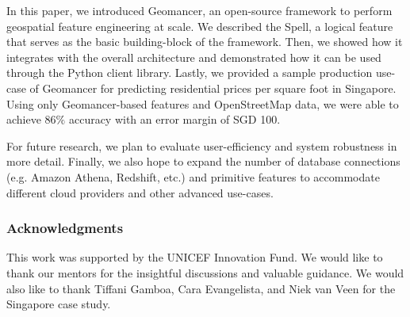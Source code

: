 \documentclass{article}
\begin{document}
In this paper, we introduced Geomancer, an open-source framework to perform
geospatial feature engineering at scale. We described the Spell, a logical
feature that serves as the basic building-block of the framework. Then, we
showed how it integrates with the overall architecture and demonstrated how it
can be used through the Python client library. Lastly, we provided a sample
production use-case of Geomancer for predicting residential prices per square
foot in Singapore. Using only Geomancer-based features and OpenStreetMap data,
we were able to achieve $86\%$ accuracy with an error margin of SGD 100. 

For future research, we plan to evaluate user-efficiency and system robustness
in more detail. Finally, we also hope to expand the number of database
connections (e.g. Amazon Athena, Redshift, etc.) and primitive features to
accommodate different cloud providers and other advanced use-cases.

\subsubsection*{Acknowledgments}

This work was supported by the UNICEF Innovation Fund. We would like to thank
our mentors for the insightful discussions and valuable guidance. We would also
like to thank Tiffani Gamboa, Cara Evangelista, and Niek van Veen for the
Singapore case study.
 



\end{document}
